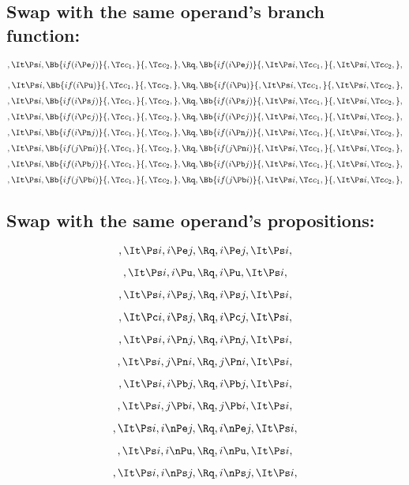 \bigskip
\bigskip
\subsection{Swap with the same operand's  branch function:}
\[,\It \Ps i, \Bb{if(i \Pe j)}{,\Tc c_1,}{,\Tc c_2,}, \Rq , \Bb{if(i \Pe j)}{,\It \Ps i, \Tc c_1,}{,\It \Ps i, \Tc c_2,},\]

\bigskip
\bigskip
\[,\It \Ps i, \Bb{if(i \Pu)}{,\Tc c_1,}{,\Tc c_2,}, \Rq , \Bb{if(i \Pu)}{,\It \Ps i, \Tc c_1,}{,\It \Ps i, \Tc c_2,},\]
\bigskip
\bigskip
\[,\It \Ps i, \Bb{if(i \Ps j)}{,\Tc c_1,}{,\Tc c_2,}, \Rq , \Bb{if(i \Ps j)}{,\It \Ps i, \Tc c_1,}{,\It \Ps i, \Tc c_2,},\]
\bigskip
\bigskip
\[,\It \Ps i, \Bb{if(i \Pc j)}{,\Tc c_1,}{,\Tc c_2,}, \Rq , \Bb{if(i \Pc j)}{,\It \Ps i, \Tc c_1,}{,\It \Ps i, \Tc c_2,},\]
\bigskip
\bigskip
\[,\It \Ps i, \Bb{if(i \Pn j)}{,\Tc c_1,}{,\Tc c_2,}, \Rq , \Bb{if(i \Pn j)}{,\It \Ps i, \Tc c_1,}{,\It \Ps i, \Tc c_2,},\]
\bigskip
\bigskip
\[,\It \Ps i, \Bb{if(j \Pn i)}{,\Tc c_1,}{,\Tc c_2,}, \Rq , \Bb{if(j \Pn i)}{,\It \Ps i, \Tc c_1,}{,\It \Ps i, \Tc c_2,},\]
\bigskip
\bigskip
\[,\It \Ps i, \Bb{if(i \Pb j)}{,\Tc c_1,}{,\Tc c_2,}, \Rq , \Bb{if(i \Pb j)}{,\It \Ps i, \Tc c_1,}{,\It \Ps i, \Tc c_2,},\]
\bigskip
\bigskip
\[,\It \Ps i, \Bb{if(j \Pb i)}{,\Tc c_1,}{,\Tc c_2,}, \Rq , \Bb{if(j \Pb i)}{,\It \Ps i, \Tc c_1,}{,\It \Ps i, \Tc c_2,},\]


\bigskip
\bigskip
\subsection{Swap with the same operand's propositions:}
\[,\It \Ps i, i \Pe j, \Rq , i \Pe j, \It \Ps i,\]

\[,\It \Ps i, i \Pu, \Rq , i \Pu, \It \Ps i,\]

\[,\It \Ps i, i \Ps j, \Rq , i \Ps j, \It \Ps i,\]

\[,\It \Pc i, i \Ps j, \Rq , i \Pc j, \It \Ps i,\]

\[,\It \Ps i, i \Pn j, \Rq , i \Pn j, \It \Ps i,\]

\[,\It \Ps i, j \Pn i, \Rq , j \Pn i, \It \Ps i,\]

\[,\It \Ps i, i \Pb j, \Rq , i \Pb j, \It \Ps i,\]

\[,\It \Ps i, j \Pb i, \Rq , j \Pb i, \It \Ps i,\]

\[,\It \Ps i, i \nPe j, \Rq , i \nPe j, \It \Ps i,\]

\[,\It \Ps i, i \nPu, \Rq , i \nPu, \It \Ps i,\]

\[,\It \Ps i, i \nPs j, \Rq , i \nPs j, \It \Ps i,\]

